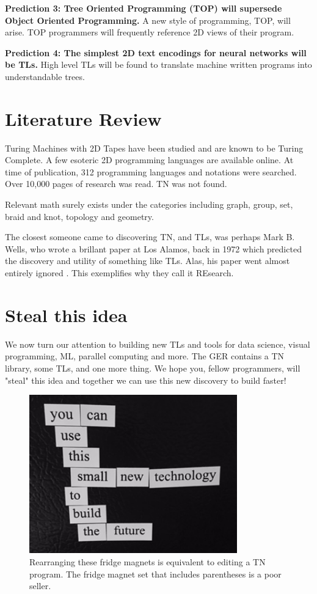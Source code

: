 \documentclass[journal]{IEEEtran}
\begin{document}
\textbf{Prediction 3: Tree Oriented Programming (TOP) will supersede Object Oriented Programming.} A new style of programming, TOP, will arise. TOP programmers will frequently reference 2D views of their program.

\textbf{Prediction 4: The simplest 2D text encodings for neural networks will be TLs.} High level TLs will be found to translate machine written programs into understandable trees.

\section{Literature Review}

Turing Machines with 2D Tapes have been studied and are known to be Turing Complete\cite{Toida}. A few esoteric 2D programming languages are available online\cite{Ender}. At time of publication, 312 programming languages and notations were searched. Over 10,000 pages of research was read. TN was not found.

Relevant math surely exists under the categories including graph, group, set, braid and knot, topology and geometry.

The closest someone came to discovering TN, and TLs, was perhaps Mark B. Wells, who wrote a brillant paper at Los Alamos, back in 1972 which predicted the discovery and utility of something like TLs. Alas, his paper went almost entirely ignored \cite{Wells}. This exemplifies why they call it REsearch.

\section{Steal this idea}

We now turn our attention to building new TLs and tools for data science, visual programming, ML, parallel computing and more. The GER contains a TN library, some TLs, and one more thing. We hope you, fellow programmers, will "steal" this idea and together we can use this new discovery to build faster!
\begin{figure}[ht!]
\centering
\includegraphics[width=90mm]{tree.jpg}
\caption{Rearranging these fridge magnets is equivalent to editing a TN program. The fridge magnet set that includes parentheses is a poor seller.}
\end{figure}
\end{document}
